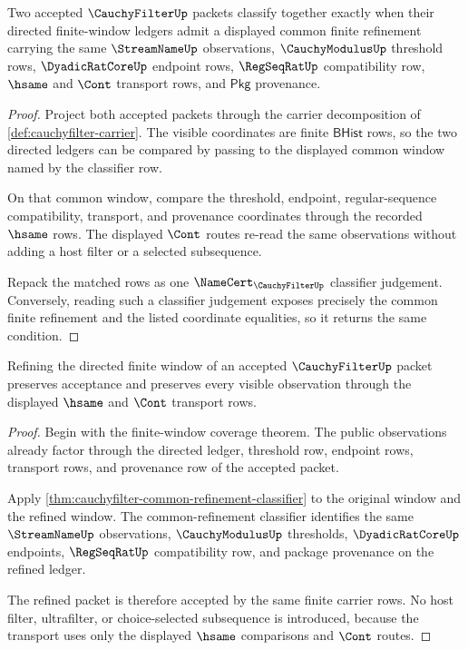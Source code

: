 \begin{theorem}\label{thm:cauchyfilter-common-refinement-classifier}
Two accepted $\CauchyFilterUp$ packets classify together exactly when their
directed finite-window ledgers admit a displayed common finite refinement
carrying the same $\StreamNameUp$ observations, $\CauchyModulusUp$ threshold
rows, $\DyadicRatCoreUp$ endpoint rows, $\RegSeqRatUp$ compatibility row,
$\hsame$ and $\Cont$ transport rows, and $\mathsf{Pkg}$ provenance.
\end{theorem}
\begin{proof}
Project both accepted packets through the carrier decomposition of
\autoref{def:cauchyfilter-carrier}. The visible coordinates are finite
$\mathsf{BHist}$ rows, so the two directed ledgers can be compared by passing
to the displayed common window named by the classifier row.

On that common window, compare the threshold, endpoint, regular-sequence
compatibility, transport, and provenance coordinates through the recorded
$\hsame$ rows. The displayed $\Cont$ routes re-read the same observations
without adding a host filter or a selected subsequence.

Repack the matched rows as one $\NameCert_{\CauchyFilterUp}$ classifier
judgement. Conversely, reading such a classifier judgement exposes precisely
the common finite refinement and the listed coordinate equalities, so it
returns the same condition.
\end{proof}

\begin{theorem}\label{thm:cauchyfilter-filter-refinement-transport}
Refining the directed finite window of an accepted $\CauchyFilterUp$ packet
preserves acceptance and preserves every visible observation through the
displayed $\hsame$ and $\Cont$ transport rows.
\end{theorem}
\begin{proof}
Begin with the finite-window coverage theorem. The public observations already
factor through the directed ledger, threshold row, endpoint rows, transport
rows, and provenance row of the accepted packet.

Apply \autoref{thm:cauchyfilter-common-refinement-classifier} to the original
window and the refined window. The common-refinement classifier identifies the
same $\StreamNameUp$ observations, $\CauchyModulusUp$ thresholds,
$\DyadicRatCoreUp$ endpoints, $\RegSeqRatUp$ compatibility row, and package
provenance on the refined ledger.

The refined packet is therefore accepted by the same finite carrier rows. No
host filter, ultrafilter, or choice-selected subsequence is introduced, because
the transport uses only the displayed $\hsame$ comparisons and $\Cont$ routes.
\end{proof}

